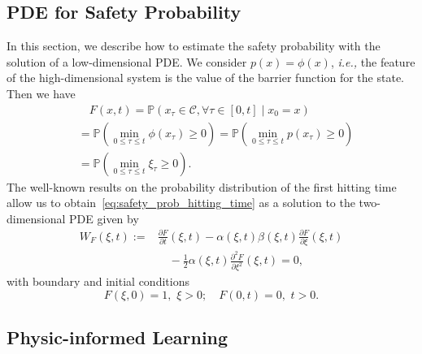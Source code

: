 \documentclass[letterpaper]{article} %
\newcommand{\todo}[1]{\textcolor{blue}{[TODO: #1]}}
\newcommand{\ie}{\textit{i.e., }}
\newcommand{\pr}{\mathbb{P}}
\newcommand{\safe}{\mathcal{C}}
\begin{document}
\subsection{PDE for Safety Probability}
In this section, we describe how to estimate the safety probability with the solution of a low-dimensional PDE. We consider $p(x) = \phi(x)$, \ie the feature of the high-dimensional system is the value of the barrier function for the state. Then we have
\begin{equation}
\label{eq:safety_prob_hitting_time}
\begin{aligned}
    & \quad F(x,t) = \pr\left(x_\tau \in \safe, \forall \tau\in [0,t] \mid x_0 =x \right) \\
    & = \pr\left(\min_{0\leq \tau \leq t} \phi(x_\tau) \geq 0\right) = \pr\left(\min_{0\leq \tau \leq t} p(x_\tau) \geq 0\right) \\
    & = \pr\left(\min_{0\leq \tau \leq t} \xi_\tau \geq 0\right).
\end{aligned}
\end{equation}
The well-known results on the probability distribution of the first hitting time~\cite{patie2008first} allow us to obtain~\eqref{eq:safety_prob_hitting_time} as a solution to the two-dimensional PDE given by
\begin{equation}
\label{eq:one_dim_PDE_safe_prob}
\begin{aligned}
    W_{F}(\xi,t) := & \frac{\partial F}{\partial t}(\xi, t) - \alpha(\xi, t)\beta(\xi, t)\frac{\partial F}{\partial \xi}(\xi, t) \\
    & \quad - \frac{1}{2} \alpha(\xi, t) \frac{\partial^2 F}{\partial \xi^2}(\xi, t) =0,
\end{aligned}
\end{equation}
with boundary and initial conditions
\begin{equation}\label{eq:safe_PDE_ic_bc}
      F(\xi, 0)  = 1, \,\, \xi > 0; \quad F(0, t)  = 0, \,\, t > 0.
\end{equation}
  


\subsection{Physic-informed Learning}
\end{document}
